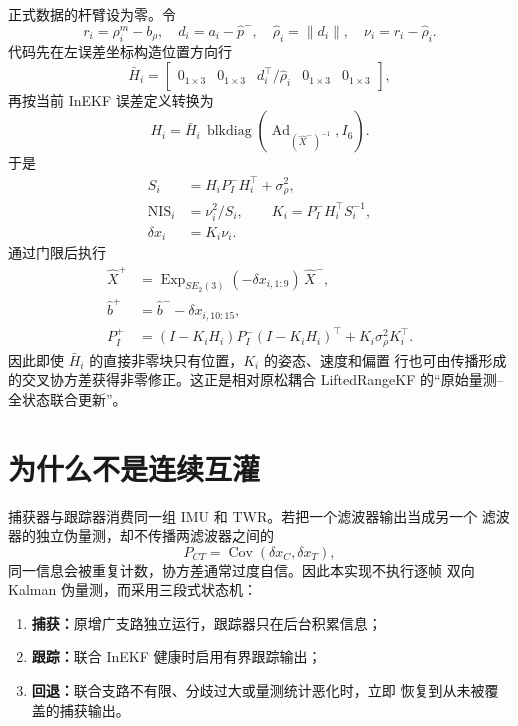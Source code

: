 \documentclass[11pt,a4paper]{ctexart}
\newcommand{\norm}[1]{\left\lVert #1\right\rVert}
\begin{document}
正式数据的杆臂设为零。令
\begin{equation}
r_i=\rho_i^m-b_\rho,\quad
d_i=a_i-\hat p^-,\quad
\hat\rho_i=\norm{d_i},\quad
\nu_i=r_i-\hat\rho_i .
\end{equation}
代码先在左误差坐标构造位置方向行
\begin{equation}
\bar H_i=
\begin{bmatrix}
0_{1\times3}&0_{1\times3}&
d_i^\top/\hat\rho_i&
0_{1\times3}&0_{1\times3}
\end{bmatrix},
\end{equation}
再按当前 InEKF 误差定义转换为
\begin{equation}
H_i=\bar H_i\,
\operatorname{blkdiag}\!\left(
\operatorname{Ad}_{(\hat X^-)^{-1}},I_6\right).
\end{equation}
于是
\begin{align}
S_i&=H_iP_I^-H_i^\top+\sigma_\rho^2,\\
\operatorname{NIS}_i&=\nu_i^2/S_i,\qquad
K_i=P_I^-H_i^\top S_i^{-1},\\
\delta x_i&=K_i\nu_i .
\end{align}
通过门限后执行
\begin{align}
\hat X^+&=\operatorname{Exp}_{SE_2(3)}
(-\delta x_{i,1:9})\,\hat X^-,\\
\hat b^+&=\hat b^--\delta x_{i,10:15},\\
P_I^+&=(I-K_iH_i)P_I^-(I-K_iH_i)^\top
+K_i\sigma_\rho^2K_i^\top .
\end{align}
因此即使 $\bar H_i$ 的直接非零块只有位置，$K_i$ 的姿态、速度和偏置
行也可由传播形成的交叉协方差获得非零修正。这正是相对原松耦合
LiftedRangeKF 的``原始量测--全状态联合更新''。

\section{为什么不是连续互灌}

捕获器与跟踪器消费同一组 IMU 和 TWR。若把一个滤波器输出当成另一个
滤波器的独立伪量测，却不传播两滤波器之间的
\begin{equation}
P_{CT}=\operatorname{Cov}(\delta x_C,\delta x_T),
\end{equation}
同一信息会被重复计数，协方差通常过度自信。因此本实现不执行逐帧
双向 Kalman 伪量测，而采用三段式状态机：
\begin{enumerate}
\item \textbf{捕获：}原增广支路独立运行，跟踪器只在后台积累信息；
\item \textbf{跟踪：}联合 InEKF 健康时启用有界跟踪输出；
\item \textbf{回退：}联合支路不有限、分歧过大或量测统计恶化时，立即
      恢复到从未被覆盖的捕获输出。
\end{enumerate}
\end{document}
